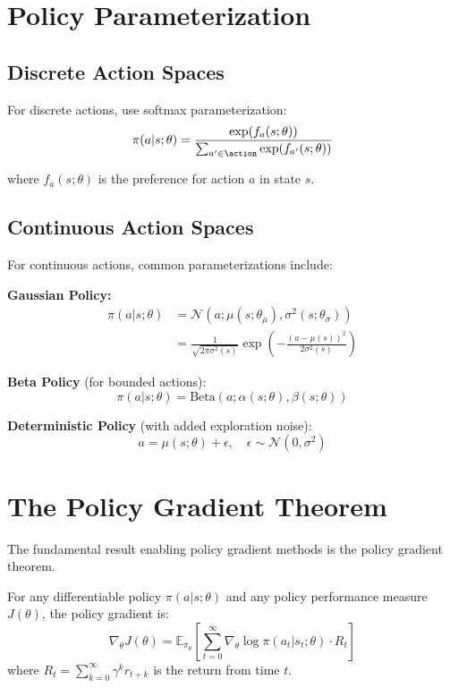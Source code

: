 \section{Policy Parameterization}

\subsection{Discrete Action Spaces}

For discrete actions, use softmax parameterization:
\begin{equation}
\pi(a|s; \theta) = \frac{\exp(f_a(s; \theta))}{\sum_{a' \in \action} \exp(f_{a'}(s; \theta))}
\end{equation}

where $f_a(s; \theta)$ is the preference for action $a$ in state $s$.

\subsection{Continuous Action Spaces}

For continuous actions, common parameterizations include:

\textbf{Gaussian Policy:}
\begin{align}
\pi(a|s; \theta) &= \mathcal{N}(a; \mu(s; \theta_\mu), \sigma^2(s; \theta_\sigma)) \\
&= \frac{1}{\sqrt{2\pi\sigma^2(s)}} \exp\left(-\frac{(a - \mu(s))^2}{2\sigma^2(s)}\right)
\end{align}

\textbf{Beta Policy} (for bounded actions):
\begin{equation}
\pi(a|s; \theta) = \text{Beta}(a; \alpha(s; \theta), \beta(s; \theta))
\end{equation}

\textbf{Deterministic Policy} (with added exploration noise):
\begin{equation}
a = \mu(s; \theta) + \epsilon, \quad \epsilon \sim \mathcal{N}(0, \sigma^2)
\end{equation}

\section{The Policy Gradient Theorem}

The fundamental result enabling policy gradient methods is the policy gradient theorem.

\begin{theorem}
For any differentiable policy $\pi(a|s; \theta)$ and any policy performance measure $J(\theta)$, the policy gradient is:
\begin{equation}
\nabla_\theta J(\theta) = \mathbb{E}_{\pi_\theta} \left[ \sum_{t=0}^\infty \nabla_\theta \log \pi(a_t|s_t; \theta) \cdot R_t \right]
\end{equation}
where $R_t = \sum_{k=0}^\infty \gamma^k r_{t+k}$ is the return from time $t$.
\end{theorem}

